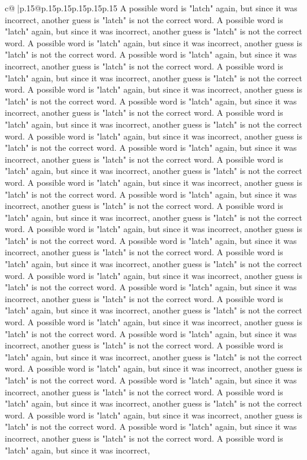 \documentclass{article}
\begin{document}
{\begin{supertabular}{c@{$\;$}|p{.15\linewidth}@{}p{.15\linewidth}p{.15\linewidth}p{.15\linewidth}p{.15\linewidth}p{.15\linewidth}}
{{{A possible word is "latch" again, but since it was incorrect, another guess is "latch" is not the correct word. A possible word is "latch" again, but since it was incorrect, another guess is "latch" is not the correct word. A possible word is "latch" again, but since it was incorrect, another guess is "latch" is not the correct word. A possible word is "latch" again, but since it was incorrect, another guess is "latch" is not the correct word. A possible word is "latch" again, but since it was incorrect, another guess is "latch" is not the correct word. A possible word is "latch" again, but since it was incorrect, another guess is "latch" is not the correct word. A possible word is "latch" again, but since it was incorrect, another guess is "latch" is not the correct word. A possible word is "latch" again, but since it was incorrect, another guess is "latch" is not the correct word. A possible word is "latch" again, but since it was incorrect, another guess is "latch" is not the correct word. A possible word is "latch" again, but since it was incorrect, another guess is "latch" is not the correct word. A possible word is "latch" again, but since it was incorrect, another guess is "latch" is not the correct word. A possible word is "latch" again, but since it was incorrect, another guess is "latch" is not the correct word. A possible word is "latch" again, but since it was incorrect, another guess is "latch" is not the correct word. A possible word is "latch" again, but since it was incorrect, another guess is "latch" is not the correct word. A possible word is "latch" again, but since it was incorrect, another guess is "latch" is not the correct word. A possible word is "latch" again, but since it was incorrect, another guess is "latch" is not the correct word. A possible word is "latch" again, but since it was incorrect, another guess is "latch" is not the correct word. A possible word is "latch" again, but since it was incorrect, another guess is "latch" is not the correct word. A possible word is "latch" again, but since it was incorrect, another guess is "latch" is not the correct word. A possible word is "latch" again, but since it was incorrect, another guess is "latch" is not the correct word. A possible word is "latch" again, but since it was incorrect, another guess is "latch" is not the correct word. A possible word is "latch" again, but since it was incorrect, another guess is "latch" is not the correct word. A possible word is "latch" again, but since it was incorrect, another guess is "latch" is not the correct word. A possible word is "latch" again, but since it was incorrect, another guess is "latch" is not the correct word. A possible word is "latch" again, but since it was incorrect, another guess is "latch" is not the correct word. A possible word is "latch" again, but since it was incorrect, another guess is "latch" is not the correct word. A possible word is "latch" again, but since it was incorrect, another guess is "latch" is not the correct word. A possible word is "latch" again, but since it was incorrect, another guess is "latch" is not the correct word. A possible word is "latch" again, but since it was incorrect, }}}
\end{supertabular}}
\end{document}
